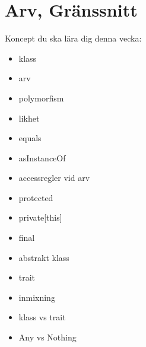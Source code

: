 \chapter{Arv, Gränssnitt}\label{chapter:W07}
Koncept du ska lära dig denna vecka:
\begin{multicols}{2}\begin{itemize}[nosep,label={$\square$},leftmargin=*]
\item klass
\item arv
\item polymorfism
\item likhet
\item equals
\item asInstanceOf
\item accessregler vid arv
\item protected
\item private[this]
\item final
\item abstrakt klass
\item trait
\item inmixning
\item klass vs trait
\item Any vs Nothing\end{itemize}\end{multicols}
